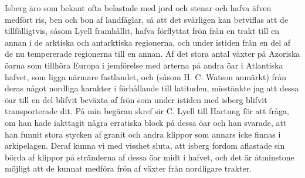 Isberg äro som bekant ofta belastade med jord och stenar och hafva äfven medfört ris, ben och bon af landfåglar, så att det svårligen kan betviflas att de tillfälligtvis, såsom Lyell framhållit, hafva förflyttat frön från en trakt till en annan i de arktiska och antarktiska regionerna, och under istiden från en del af de nu tempererade regionerna till en annan. Af det stora antal växter på Azoriska öarna som tillhöra Europa i jemförelse med arterna på andra öar i Atlantiska hafvet, som ligga närmare fastlandet, och (såsom H. C. Watson anmärkt) från deras något nordliga karakter i förhållande till latituden, misstänkte jag att dessa öar till en del blifvit beväxta af frön som under istiden med isberg blifvit transporterade dit. På min begäran skref sir C. Lyell till Hartung för att fråga, om han hade iakttagit några erratiska block på dessa öar och han svarade, att han funnit stora stycken af granit och andra klippor som annars icke finnas i arkipelagen. Deraf kunna vi med visshet sluta, att isberg fordom aflastade sin börda af klippor på stränderna af dessa öar midt i hafvet, och det är åtminstone möjligt att de kunnat medföra frön af växter från nordligare trakter.

